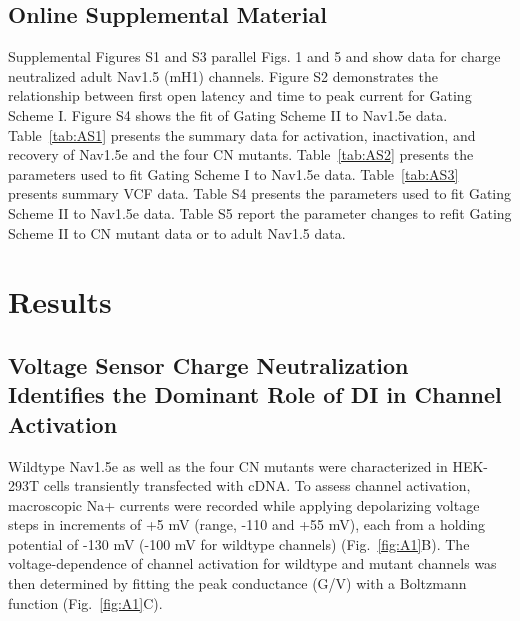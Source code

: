 \subsection{Online Supplemental Material}
Supplemental Figures S1 and S3 parallel Figs. 1 and 5 and show data for charge neutralized adult Nav1.5 (mH1) channels. Figure S2 demonstrates the relationship between first open latency and time to peak current for Gating Scheme I. Figure S4 shows the fit of Gating Scheme II to Nav1.5e data. Table~\ref{tab:AS1} presents the summary data for activation, inactivation, and recovery of Nav1.5e and the four CN mutants. Table~\ref{tab:AS2} presents the parameters used to fit Gating Scheme I to Nav1.5e data. Table~\ref{tab:AS3} presents summary VCF data. Table S4 presents the parameters used to fit Gating Scheme II to Nav1.5e data. Table S5 report the parameter changes to refit Gating Scheme II to CN mutant data or to adult Nav1.5 data.

\section{Results}
\subsection{Voltage Sensor Charge Neutralization Identifies the Dominant Role of DI in Channel Activation}
Wildtype Nav1.5e as well as the four CN mutants were characterized in HEK-293T cells transiently transfected with cDNA. To assess channel activation, macroscopic Na+ currents were recorded while applying depolarizing voltage steps in increments of +5 mV (range, -110 and +55 mV), each from a holding potential of -130 mV (-100 mV for wildtype channels) (Fig.~\ref{fig:A1}B). The voltage-dependence of channel activation for wildtype and mutant channels was then determined by fitting the peak conductance (G/V) with a Boltzmann function (Fig.~\ref{fig:A1}C). 


